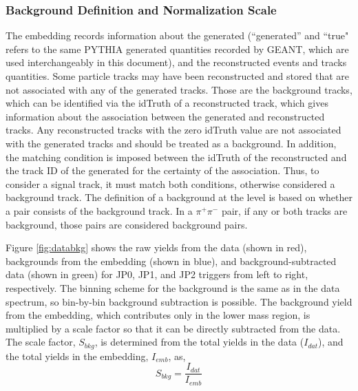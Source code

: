 \subsubsection{Background Definition and Normalization Scale} 
\label{subsec:bkg}
The embedding records information about the generated (``generated'' and ``true" refers to the same PYTHIA generated quantities recorded by GEANT, which are used interchangeably in this document), and the reconstructed events and tracks quantities. Some particle tracks may have been reconstructed and stored that are not associated with any of the generated tracks. Those are the background tracks, which can be identified via the idTruth of a reconstructed track, which gives information about the association between the generated and reconstructed tracks. Any reconstructed tracks with the zero idTruth value are not associated with the generated tracks and should be treated as a background. In addition, the matching condition is imposed between the idTruth of the reconstructed and the track ID of the generated for the certainty of the association. Thus, to consider a signal track, it must match both conditions, otherwise considered a background track. The definition of a background at the \dipion level is based on whether a pair consists of the background track. In a $\pi^+\pi^-$ pair, if any or both tracks are background, those pairs are considered background pairs.

Figure \ref{fig:databkg} shows the raw \dipion yields from the data (shown in red), backgrounds from the embedding (shown in blue), and background-subtracted data (shown in green) for JP0, JP1, and JP2 triggers from left to right, respectively. The binning scheme for the background is the same as in the data spectrum, so bin-by-bin background subtraction is possible. The \dipion background yield from the embedding, which contributes only in the lower mass region, is multiplied by a scale factor so that it can be directly subtracted from the data. The scale factor, $S_{bkg}$, is determined from the total \dipion yields in the data ($I_{dat}$), and the total \dipion yields in the embedding, $I_{emb}$, as,
\begin{equation}
    S_{bkg} = \frac{I_{dat}}{I_{emb}}
\end{equation}


